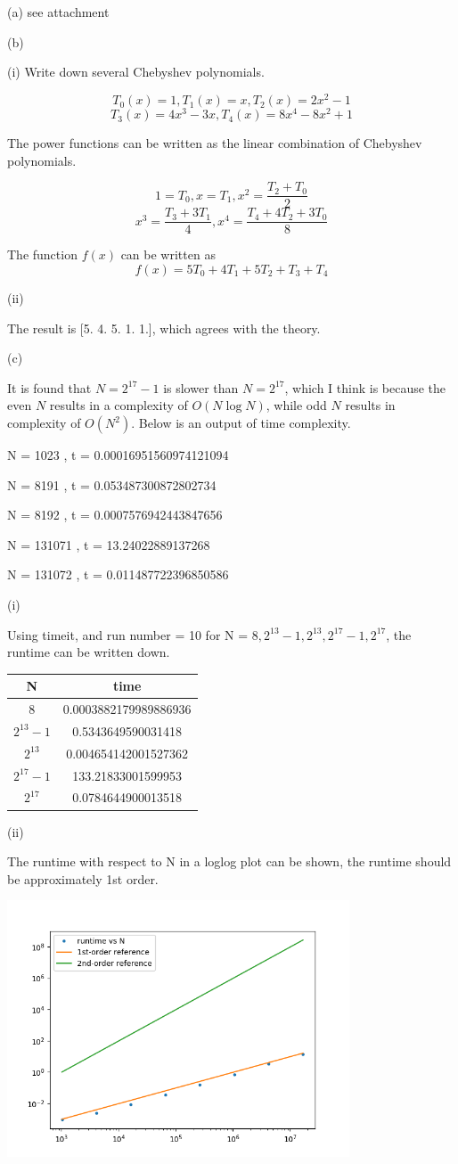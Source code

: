\documentclass[10pt]{article}
\begin{document}
\section{}

(a) see attachment

(b)

(i) Write down several Chebyshev polynomials.

$$
T_0(x)=1, T_1(x)=x,T_2(x)=2x^2-1
$$
$$
T_3(x)=4x^3-3x, T_4(x)=8x^4-8x^2+1
$$

The power functions can be written as the linear combination of Chebyshev polynomials.

$$
1=T_0, x=T_1, x^2=\frac{T_2+T_0}{2}
$$
$$
x^3=\frac{T_3+3T_1}{4}, x^4=\frac{T_4+4T_2+3T_0}{8}
$$

The function $f(x)$ can be written as
$$
f(x)=5T_0+4T_1+5T_2+T_3+T_4
$$


(ii)

The result is [5. 4. 5. 1. 1.], which agrees with the theory.

(c)

It is found that $N=2^{17}-1$ is slower than $N=2^{17}$, which I think is because the even $N$ results in a complexity of $O(N\log N)$, while odd $N$ results in complexity of $O(N^2)$. Below is an output of time complexity.

N = 1023 , t = 0.00016951560974121094

N = 8191 , t = 0.053487300872802734

N = 8192 , t = 0.0007576942443847656

N = 131071 , t = 13.24022889137268

N = 131072 , t = 0.011487722396850586

(i)

Using timeit, and run number = 10 for N = $8,2^{13}-1,2^{13},2^{17}-1,2^{17}$, the runtime can be written down.

\begin{tabular}{cc}
\hline
N & time\\
\hline
8 & 0.0003882179989886936\\
$2^{13}-1$ & 0.5343649590031418\\
$2^{13}$ & 0.004654142001527362\\
$2^{17}-1$ & 133.21833001599953\\
$2^{17}$ & 0.0784644900013518\\
\hline
\end{tabular}

(ii)

The runtime with respect to N in a loglog plot can be shown, the runtime should be approximately 1st order.

\includegraphics[width=4in]{p3cii.png}
\end{document}
